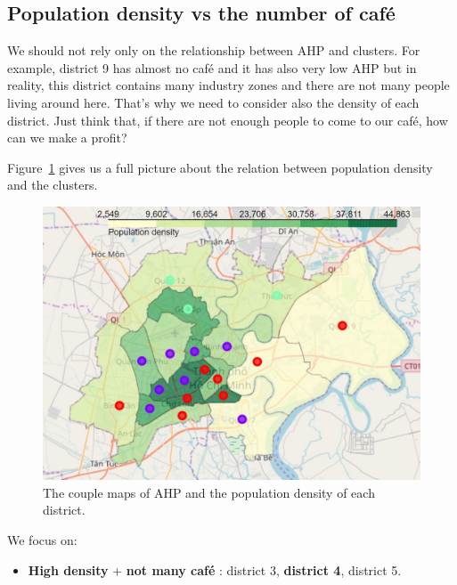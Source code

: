 \documentclass[12pt,a4paper]{article}
\begin{document}
\subsection{Population density vs the number of café}

We should not rely only on the relationship between AHP and clusters. For example, district 9 has almost no café and it has also very low AHP but in reality, this district contains many industry zones and there are not many people living around here. That's why we need to consider also the density of each district. Just think that, if there are not enough people to come to our café, how can we make a profit?

Figure~\ref{fig:ahp_density} gives us a full picture about the relation between population density and the clusters.

 \begin{center}
    \begin{figure}[htp]
    \begin{center}
     \includegraphics[width=\textwidth]{fig/ahp_density}
    \end{center}
    \caption{The couple maps of AHP and the population density of each district.}
    \label{fig:ahp_density}
    \end{figure}
\end{center}

We focus on:

\begin{itemize}
\item \textbf{High density} + \textbf{not many café} : district 3, \textbf{district 4}, district 5.
\end{itemize}
\end{document}
